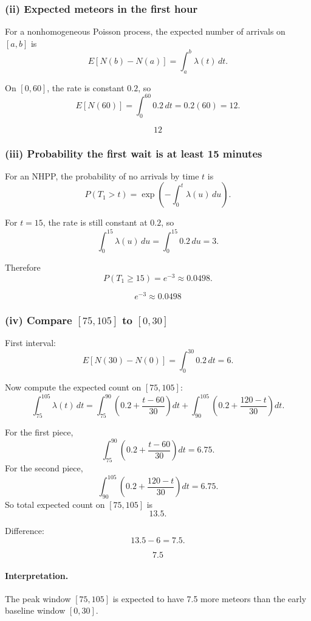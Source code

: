 \documentclass[11pt]{article}
\begin{document}
\subsubsection*{(ii) Expected meteors in the first hour}

For a nonhomogeneous Poisson process, the expected number of arrivals on $[a,b]$ is
\[
E[N(b)-N(a)]=\int_a^b \lambda(t)\,dt.
\]

On $[0,60]$, the rate is constant $0.2$, so
\[
E[N(60)]
=
\int_0^{60}0.2\,dt
=
0.2(60)=12.
\]

\[
\boxed{12}
\]

\subsubsection*{(iii) Probability the first wait is at least 15 minutes}

For an NHPP, the probability of no arrivals by time $t$ is
\[
P(T_1>t)=\exp\left(-\int_0^t \lambda(u)\,du\right).
\]

For $t=15$, the rate is still constant at $0.2$, so
\[
\int_0^{15}\lambda(u)\,du
=
\int_0^{15}0.2\,du
=
3.
\]

Therefore
\[
P(T_1\ge15)=e^{-3}\approx 0.0498.
\]

\[
\boxed{e^{-3}\approx 0.0498}
\]

\subsubsection*{(iv) Compare $[75,105]$ to $[0,30]$}

First interval:
\[
E[N(30)-N(0)]=\int_0^{30}0.2\,dt=6.
\]

Now compute the expected count on $[75,105]$:
\[
\int_{75}^{105}\lambda(t)\,dt
=
\int_{75}^{90}\left(0.2+\frac{t-60}{30}\right)dt
+
\int_{90}^{105}\left(0.2+\frac{120-t}{30}\right)dt.
\]

For the first piece,
\[
\int_{75}^{90}\left(0.2+\frac{t-60}{30}\right)dt
=
6.75.
\]
For the second piece,
\[
\int_{90}^{105}\left(0.2+\frac{120-t}{30}\right)dt
=
6.75.
\]
So total expected count on $[75,105]$ is
\[
13.5.
\]

Difference:
\[
13.5-6=7.5.
\]

\[
\boxed{7.5}
\]

\paragraph{Interpretation.}  
The peak window $[75,105]$ is expected to have 7.5 more meteors than the early baseline window $[0,30]$.
\end{document}
